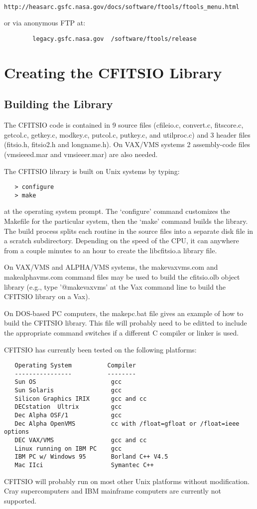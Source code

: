 \begin{verbatim}
        http://heasarc.gsfc.nasa.gov/docs/software/ftools/ftools_menu.html
\end{verbatim}
or via anonymous FTP at:

\begin{verbatim}
        legacy.gsfc.nasa.gov  /software/ftools/release
\end{verbatim}

\chapter{ Creating the CFITSIO Library }


\section{Building the Library}

The CFITSIO code is contained in 9 source files (cfileio.c, convert.c,
fitscore.c, getcol.c, getkey.c, modkey.c, putcol.c, putkey.c, and
utilproc.c) and 3 header files (fitsio.h, fitsio2.h and longname.h).
On VAX/VMS systems 2 assembly-code files (vmsieeed.mar and
vmsieeer.mar) are also needed.

The CFITSIO library is built on Unix systems by typing:

\begin{verbatim}
   > configure
   > make
\end{verbatim}
at the operating system prompt.  The `configure' command customizes
the Makefile for the particular system, then the `make' command
builds the library.  The build process splits each routine in the
source files into a separate disk file in a scratch subdirectory.
Depending on the speed of the CPU, it can anywhere from a couple
minutes to an hour to create the libcfitsio.a library file.

On VAX/VMS and ALPHA/VMS systems, the makevaxvms.com and makealphavms.com
command files may be used to build the cfitsio.olb object library
(e.g., type '@makevaxvms' at the Vax command line to build the CFITSIO
library on a Vax).

On DOS-based PC computers, the makepc.bat file gives an example
of how to build the CFITSIO library.  This file will probably
need to be editted to include the appropriate command switches
if a different C compiler or linker is used.

CFITSIO has currently been tested on the following platforms:

\begin{verbatim}
   Operating System          Compiler
   ----------------          --------
   Sun OS                     gcc
   Sun Solaris                gcc
   Silicon Graphics IRIX      gcc and cc
   DECstation  Ultrix         gcc
   Dec Alpha OSF/1            gcc
   Dec Alpha OpenVMS          cc with /float=gfloat or /float=ieee options
   DEC VAX/VMS                gcc and cc
   Linux running on IBM PC    gcc
   IBM PC w/ Windows 95       Borland C++ V4.5
   Mac IIci                   Symantec C++
\end{verbatim}
CFITSIO will probably run on most other Unix platforms without
modification.  Cray supercomputers and IBM mainframe computers are
currently not supported.


